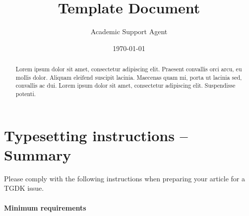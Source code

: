 \documentclass{article}
\title{Template Document}
\author{Academic Support Agent}
\date{\today}
\begin{document}
\maketitle

\maketitle

\begin{abstract}
Lorem ipsum dolor sit amet, consectetur adipiscing elit. Praesent convallis orci arcu, eu mollis dolor. Aliquam eleifend suscipit lacinia. Maecenas quam mi, porta ut lacinia sed, convallis ac dui. Lorem ipsum dolor sit amet, consectetur adipiscing elit. Suspendisse potenti. 
\end{abstract}

\section{Typesetting instructions -- Summary}
\label{sec:typesetting-summary}

Please comply with the following instructions when preparing your article for a TGDK issue. 
\paragraph*{Minimum requirements}
\end{document}
